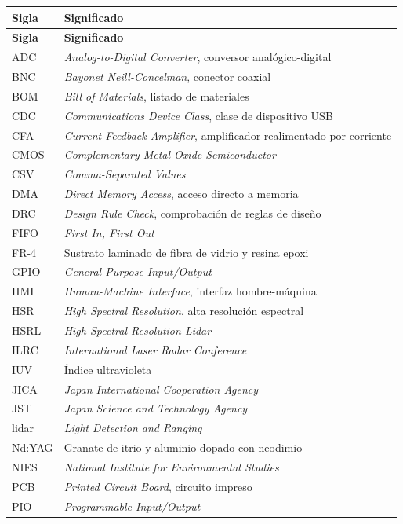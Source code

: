 \begin{longtable}{@{}p{}p{}@{}}
\toprule
\textbf{Sigla} & \textbf{Significado} \\
\midrule
\endfirsthead
\toprule
\textbf{Sigla} & \textbf{Significado} \\
\midrule
\endhead
\bottomrule
\endlastfoot
ADC & \emph{Analog-to-Digital Converter}, conversor analógico-digital \\
BNC & \emph{Bayonet Neill-Concelman}, conector coaxial \\
BOM & \emph{Bill of Materials}, listado de materiales \\
CDC & \emph{Communications Device Class}, clase de dispositivo USB \\
CFA & \emph{Current Feedback Amplifier}, amplificador realimentado por corriente \\
CMOS & \emph{Complementary Metal-Oxide-Semiconductor} \\
CSV & \emph{Comma-Separated Values} \\
DMA & \emph{Direct Memory Access}, acceso directo a memoria \\
DRC & \emph{Design Rule Check}, comprobación de reglas de diseño \\
FIFO & \emph{First In, First Out} \\
FR-4 & Sustrato laminado de fibra de vidrio y resina epoxi \\
GPIO & \emph{General Purpose Input/Output} \\
HMI & \emph{Human-Machine Interface}, interfaz hombre-máquina \\
HSR & \emph{High Spectral Resolution}, alta resolución espectral \\
HSRL & \emph{High Spectral Resolution Lidar} \\
ILRC & \emph{International Laser Radar Conference} \\
IUV & Índice ultravioleta \\
JICA & \emph{Japan International Cooperation Agency} \\
JST & \emph{Japan Science and Technology Agency} \\
lidar & \emph{Light Detection and Ranging} \\
Nd:YAG & Granate de itrio y aluminio dopado con neodimio \\
NIES & \emph{National Institute for Environmental Studies} \\
PCB & \emph{Printed Circuit Board}, circuito impreso \\
PIO & \emph{Programmable Input/Output} \\

\end{longtable}
